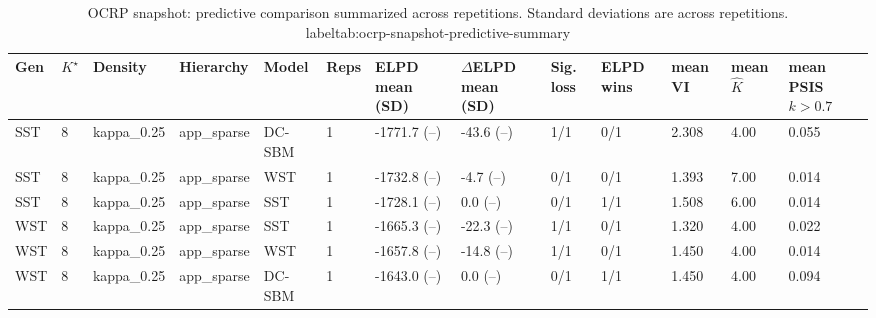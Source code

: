 \begin{table}[!h]
\centering
\caption{OCRP snapshot: predictive comparison summarized across repetitions. Standard deviations are across repetitions.\\label{tab:ocrp-snapshot-predictive-summary}}
\centering
\begin{tabular}[t]{lllllllllllll}
\toprule
Gen & $K^\star$ & Density & Hierarchy & Model & Reps & ELPD mean (SD) & $\Delta$ELPD mean (SD) & Sig. loss & ELPD wins & mean VI & mean $\hat K$ & mean PSIS $k>0.7$\\
\midrule
SST & 8 & kappa_0.25 & app_sparse & DC-SBM & 1 & -1771.7 (--) & -43.6 (--) & 1/1 & 0/1 & 2.308 & 4.00 & 0.055\\
SST & 8 & kappa_0.25 & app_sparse & WST & 1 & -1732.8 (--) & -4.7 (--) & 0/1 & 0/1 & 1.393 & 7.00 & 0.014\\
SST & 8 & kappa_0.25 & app_sparse & SST & 1 & -1728.1 (--) & 0.0 (--) & 0/1 & 1/1 & 1.508 & 6.00 & 0.014\\
WST & 8 & kappa_0.25 & app_sparse & SST & 1 & -1665.3 (--) & -22.3 (--) & 1/1 & 0/1 & 1.320 & 4.00 & 0.022\\
WST & 8 & kappa_0.25 & app_sparse & WST & 1 & -1657.8 (--) & -14.8 (--) & 1/1 & 0/1 & 1.450 & 4.00 & 0.014\\
WST & 8 & kappa_0.25 & app_sparse & DC-SBM & 1 & -1643.0 (--) & 0.0 (--) & 0/1 & 1/1 & 1.450 & 4.00 & 0.094\\
\bottomrule
\end{tabular}
\end{table}
